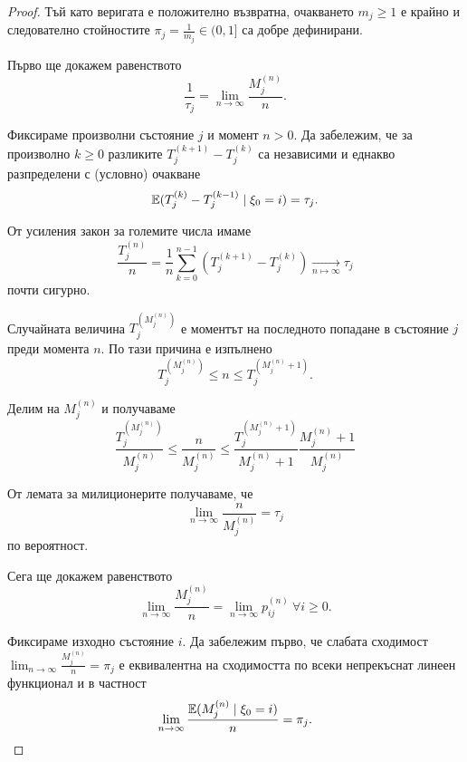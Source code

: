 \documentclass[numbers=endperiod, DIV=15, bibliography=totocnumbered]{scrartcl}
\begin{document}
\begin{proof}
  Тъй като веригата е положително възвратна, очакването $m_j \geq 1$ е крайно и следователно стойностите $\pi_j = \frac 1 {m_j} \in (0, 1]$ са добре дефинирани.

  Първо ще докажем равенството
  \begin{displaymath}
    \frac 1 {\tau_j}
    =
    \lim_{n \to \infty} \frac {M^{(n)}_j} n.
  \end{displaymath}

  Фиксираме произволни състояние $j$ и момент $n > 0$. Да забележим, че за произволно $k \geq 0$ разликите $T_j^{(k+1)} - T_j^{(k)}$ са независими и еднакво разпределени с (условно) очакване
  \begin{displaymath}
   \mathbb{E}(T_j^{(k)} - T_j^{(k-1)} \mid \xi_0 = i) = \tau_j.
  \end{displaymath}

  От усиления закон за големите числа имаме
  \begin{displaymath}
    \frac {T_j^{(n)}} n = \frac 1 n \sum_{k=0}^{n-1} (T_j^{(k+1)} - T_j^{(k)}) \underset {n \mapsto \infty} \longrightarrow \tau_j
  \end{displaymath}
  почти сигурно.

  Случайната величина $T_j^{(M_j^{(n)})}$ е моментът на последното попадане в състояние $j$ преди момента $n$. По тази причина е изпълнено
  \begin{displaymath}
    T_j^{(M_j^{(n)})} \leq n \leq T_j^{(M_j^{(n)} + 1)}.
  \end{displaymath}

  Делим на $M_j^{(n)}$ и получаваме
  \begin{displaymath}
    \frac {T_j^{(M_j^{(n)})}} {M_j^{(n)}} \leq \frac n {M_j^{(n)}} \leq \frac {T_j^{(M_j^{(n)} + 1)}} {M_j^{(n)} + 1} \frac {M_j^{(n)} + 1} {M_j^{(n)}}
  \end{displaymath}

  От лемата за милиционерите получаваме, че
  \begin{displaymath}
    \lim_{n \to \infty} \frac n {M^{(n)}_j}
    =
    \tau_j
  \end{displaymath}
  по вероятност.

  Сега ще докажем равенството
  \begin{displaymath}
    \lim_{n \to \infty} \frac {M^{(n)}_j} n
    =
    \lim_{n \to \infty} p_{ij}^{(n)}~\forall i \geq 0.
  \end{displaymath}

  Фиксираме изходно състояние $i$. Да забележим първо, че слабата сходимост $\lim_{n \to \infty} \frac {M^{(n)}_j} n = \pi_j$ е еквивалентна на сходимостта по всеки непрекъснат линеен функционал и в частност
  \begin{displaymath}
    \lim_{n \to \infty} \frac {\mathbb{E}(M^{(n)}_j \mid \xi_0 = i)} n = \pi_j.
  \end{displaymath}


\end{proof}
\end{document}

